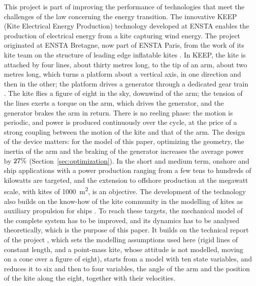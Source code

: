 This project is part of improving the performance of technologies that meet the challenges of the law concerning the energy transition.
The innovative KEEP (Kite Electrical Energy Production) technology developed at ENSTA enables the production of electrical energy from a kite capturing wind energy.
The project originated at ENSTA Bretagne, now part of ENSTA Paris, from the work of its kite team on the structure of leading edge inflatable kites \cite{Desenclos2023MCM}.
In KEEP, the kite is attached by four lines, about thirty metres long, to the tip of an arm, about two metres long, which turns a platform about a vertical axis, in one direction and then in the other; the platform drives a generator through a dedicated gear train \cite{Bavoil2024KEEP}.
The kite flies a figure of eight in the sky, downwind of the arm; the tension of the lines exerts a torque on the arm, which drives the generator, and the generator brakes the arm in return.
There is no reeling phase: the motion is periodic, and power is produced continuously over the cycle, at the price of a strong coupling between the motion of the kite and that of the arm.
The design of the device matters: for the model of this paper, optimizing the geometry, the inertia of the arm and the braking of the generator increases the average power by \(27\%\) (Section~\ref{sec:optimization}).
In the short and medium term, onshore and ship applications with a power production ranging from a few tens to hundreds of kilowatts are targeted, and the extension to offshore production at the megawatt scale, with kites of \SI{1000}{\square\meter}, is an objective.
The development of the technology also builds on the know-how of the kite community in the modelling of kites as auxiliary propulsion for ships \cite{Leloup2014OE}.
To reach these targets, the mechanical model of the complete system has to be improved, and its dynamics has to be analysed theoretically, which is the purpose of this paper.
It builds on the technical report of the project \cite{Bavoil2024KEEP}, which sets the modelling assumptions used here (rigid lines of constant length, and a point-mass kite, whose attitude is not modelled, moving on a cone over a figure of eight), starts from a model with ten state variables, and reduces it to six and then to four variables, the angle of the arm and the position of the kite along the eight, together with their velocities.

